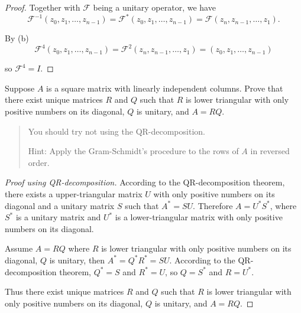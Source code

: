 \begin{proof}
    Together with $\mathscr{F}$ being a unitary operator, we have
    \[
        \mathscr{F}^{-1}(z_{0}, z_{1}, \ldots, z_{n-1}) = \mathscr{F}^{*}(z_{0}, z_{1}, \ldots, z_{n-1}) = \mathscr{F}(z_{n}, z_{n-1}, \ldots, z_{1}).
    \]

    By (b)
    \[
        \mathscr{F}^{4}(z_{0}, z_{1}, \ldots, z_{n-1}) = \mathscr{F}^{2}(z_{n}, z_{n-1}, \ldots, z_{1}) = (z_{0}, z_{1}, \ldots, z_{n-1})
    \]

    so $\mathscr{F}^{4} = I$.
\end{proof}
\newpage

\begin{exercise}
    Suppose $A$ is a square matrix with linearly independent columns. Prove that there exist unique matrices $R$ and $Q$ such that $R$ is lower triangular with only positive numbers on its diagonal, $Q$ is unitary, and $A = RQ$.
\end{exercise}

\begin{quote}
    You should try not using the QR-decomposition.

    Hint: Apply the Gram-Schmidt's procedure to the rows of $A$ in reversed order.
\end{quote}

\begin{proof}[Proof using QR-decomposition]
    According to the QR-decomposition theorem, there exists a upper-triangular matrix $U$ with only positive numbers on its diagonal and a unitary matrix $S$ such that $A^{*} = SU$. Therefore $A = U^{*}S^{*}$, where $S^{*}$ is a unitary matrix and $U^{*}$ is a lower-triangular matrix with only positive numbers on its diagonal.

    Assume $A = RQ$ where $R$ is lower triangular with only positive numbers on its diagonal, $Q$ is unitary, then $A^{*} = Q^{*}R^{*} = SU$. According to the QR-decomposition theorem, $Q^{*} = S$ and $R^{*} = U$, so $Q = S^{*}$ and $R = U^{*}$.

    Thus there exist unique matrices $R$ and $Q$ such that $R$ is lower triangular with only positive numbers on its diagonal, $Q$ is unitary, and $A = RQ$.
\end{proof}

